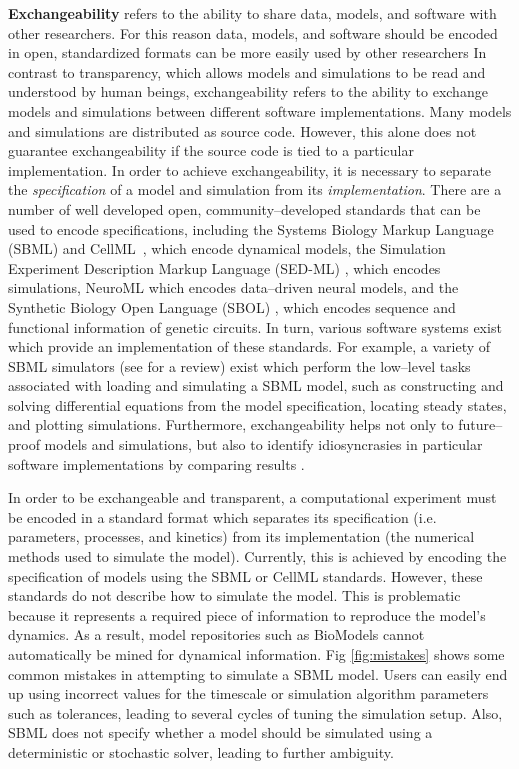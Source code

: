 \documentclass[10pt,letterpaper]{article}
\begin{document}
\textbf{Exchangeability} refers to the ability to share data, models, and software with other researchers. For this reason data, models, and software should be encoded in open, standardized formats can be more easily used by other researchers  In contrast to transparency, which allows models and simulations to be read and understood by human beings, exchangeability refers to the ability to exchange models and simulations between different software implementations. Many models and simulations are distributed as source code. However, this alone does not guarantee exchangeability if the source code is tied to a particular implementation. In order to achieve exchangeability, it is necessary to separate the \textit{specification} of a model and simulation from its \textit{implementation}. There are a number of well developed open, community--developed standards that can be used to encode specifications, including the Systems Biology Markup Language (SBML) \cite{hucka2003systems,bornstein2008libsbml} and CellML~\cite{cuellar2003overview}, which encode dynamical models, the Simulation Experiment Description Markup Language (SED-ML) \cite{waltemath2011reproducible}, which encodes simulations, NeuroML \cite{gleeson2010neuroml} which encodes data--driven neural models, and the Synthetic Biology Open Language (SBOL) \cite{bartley2015synthetic,galdzicki2014synthetic}, which encodes sequence and functional information of genetic circuits. In turn, various software systems exist which provide an implementation of these standards. For example, a variety of SBML simulators (see \cite{sauro2008standards} %
for a review) exist which perform the low--level tasks associated with loading and simulating a SBML model, such as constructing and solving differential equations from the model specification, locating steady states, and plotting simulations. Furthermore, exchangeability helps not only to future--proof models and simulations, but also to identify idiosyncrasies in particular software implementations by comparing results \cite{bergmann2008comparing}.

In order to be exchangeable and transparent, a computational experiment must be encoded in a standard format which separates its specification (i.e. parameters, processes, and kinetics) from its implementation (the numerical methods used to simulate the model). Currently, this is achieved by encoding the specification of models using the SBML or CellML standards. However, these standards do not describe how to simulate the model. This is problematic because it represents a required piece of information to reproduce the model's dynamics. As a result, model repositories such as BioModels \cite{le2006biomodels} cannot automatically be mined for dynamical information. Fig \ref{fig:mistakes} shows some common mistakes in attempting to simulate a SBML model. Users can easily end up using incorrect values for the timescale or simulation algorithm parameters such as tolerances, leading to several cycles of tuning the simulation setup. Also, SBML does not specify whether a model should be simulated using a deterministic or stochastic solver, leading to further ambiguity.
\end{document}
